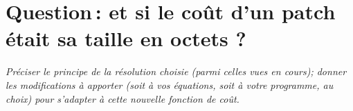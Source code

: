 \documentclass[a4paper, 10pt, french]{article}
\begin{document}
\section{Question\,: et  si le coût d'un patch était sa taille en octets ?}
{\em Préciser le principe de la résolution choisie (parmi celles vues en cours); donner  les modifications à apporter (soit à vos  équations, soit à votre programme, au choix)
pour s'adapter à cette nouvelle fonction de coût.
}
\end{document}
